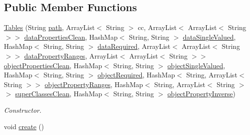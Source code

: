 \subsection*{Public Member Functions}
\begin{DoxyCompactItemize}
\item 
\hyperlink{class_data_base_1_1_tables_ac8d01fe9c39bbf7ba1580417ef4b4dcf}{Tables} (String \hyperlink{class_data_base_1_1_tables_ae80958e71da9b7fc4bf4e138f377b59f}{path}, ArrayList$<$ String $>$ cc, ArrayList$<$ ArrayList$<$ String $>$$>$ \hyperlink{class_data_base_1_1_tables_af9e966f29b9024df669c77cc0d767c78}{dataPropertiesClean}, HashMap$<$ String, String $>$ \hyperlink{class_data_base_1_1_tables_a40e2a6f8f60048f0a393e9d03e8fcfd8}{dataSingleValued}, HashMap$<$ String, String $>$ \hyperlink{class_data_base_1_1_tables_af968a71b80946ad236d287dad7a68774}{dataRequired}, ArrayList$<$ ArrayList$<$ String $>$$>$ \hyperlink{class_data_base_1_1_tables_ac4fac81e62e9331f412a2ede3ddcc502}{dataPropertyRanges}, ArrayList$<$ ArrayList$<$ String $>$$>$ \hyperlink{class_data_base_1_1_tables_aefcb4c8a578671a32a64c3196281f479}{objectPropertiesClean}, HashMap$<$ String, String $>$ \hyperlink{class_data_base_1_1_tables_ae379376430f85d3c7cef16bf1a962ff1}{objectSingleValued}, HashMap$<$ String, String $>$ \hyperlink{class_data_base_1_1_tables_a11874c966b0f22fc88b7fb46cb3331ed}{objectRequired}, HashMap$<$ String, ArrayList$<$ String $>$$>$ \hyperlink{class_data_base_1_1_tables_af580afd6f42aac3503cecab2e615ef73}{objectPropertyRanges}, HashMap$<$ String, ArrayList$<$ String $>$$>$ \hyperlink{class_data_base_1_1_tables_a5ec0af78ac892df612bf3ea7a91e37c5}{superClassesClean}, HashMap$<$ String, String $>$ \hyperlink{class_data_base_1_1_tables_a0465d81797980577fb423e6140df7110}{objectPropertyInverse})
\begin{DoxyCompactList}\small\item\em Constructor. \end{DoxyCompactList}\item 
\hypertarget{class_data_base_1_1_tables_ab7a2f1ec2301fb5399c67950c3939482}{
void \hyperlink{class_data_base_1_1_tables_ab7a2f1ec2301fb5399c67950c3939482}{create} ()}
\label{class_data_base_1_1_tables_ab7a2f1ec2301fb5399c67950c3939482}


\end{DoxyCompactItemize}
